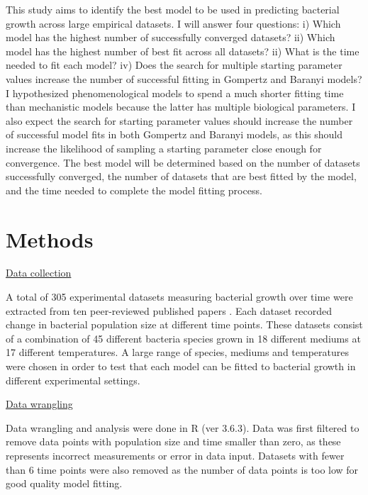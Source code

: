 \documentclass[11pt]{article}
\begin{document}
This study aims to identify the best model to be used in predicting bacterial growth across large empirical datasets. I will answer four questions: i) Which model has the highest number of successfully converged datasets? ii) Which model has the highest number of best fit across all datasets? ii) What is the time needed to fit each model? iv) Does the search for multiple starting parameter values increase the number of successful fitting in Gompertz and Baranyi models? I hypothesized phenomenological models to spend a much shorter fitting time than mechanistic models because the latter has multiple biological parameters. I also expect the search for starting parameter values should increase the number of successful model fits in both Gompertz and Baranyi models, as this should increase the likelihood of sampling a starting parameter close enough for convergence. The best model will be determined based on the number of datasets successfully converged, the number of datasets that are best fitted by the model, and the time needed to complete the model fitting process.



\section{Methods}

\underline{Data collection} 

A total of 305 experimental datasets measuring bacterial growth over time were extracted from ten peer-reviewed published papers \cite{roth_continuity_1962, stannard_temperaturegrowth_1985, phillips_relation_1987, sivonen_effects_1990, zwietering_modeling_1990, gill_growth_1991, bae_growth_2014, galarz_predicting_2016, bernhardt_metabolic_2018, silva_modelling_2018}. Each dataset recorded change in bacterial population size at different time points. These datasets consist of a combination of 45 different bacteria species grown in 18 different mediums at 17 different temperatures. A large range of species, mediums and temperatures were chosen in order to test that each model can be fitted to bacterial growth in different experimental settings. 
\vspace{\baselineskip}

\underline{Data wrangling}

Data wrangling and analysis were done in R (ver 3.6.3). Data was first filtered to remove data points with population size and time smaller than zero, as these represents incorrect measurements or error in data input. Datasets with fewer than 6 time points were also removed as the number of data points is too low for good quality model fitting. 
\vspace{\baselineskip}
\end{document}
